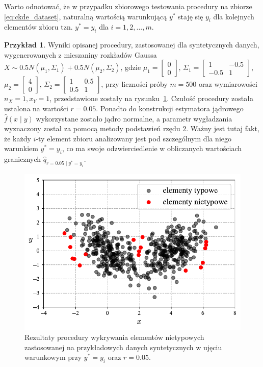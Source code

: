\documentclass[12pt,a4paper,oneside]{book}
\theoremstyle{definition}
\newtheorem{exmp}{Przykład}[chapter]
\begin{document}
Warto odnotować, że w przypadku zbiorowego testowania procedury na zbiorze \eqref{eq:ckde_dataset}, naturalną wartością warunkującą $y^*$ staję się $y_i$ dla kolejnych elementów zbioru tzn. $y^* = y_i$ dla $i=1,2,...,m$.

\begin{exmp} \label{exmp:outliers_detection_example2}
Wyniki opisanej procedury, zastosowanej dla syntetycznych danych, wygenerowanych z mieszaniny rozkładów Gaussa $X \sim 0.5 N(\mu_1,\Sigma_1) + 0.5 N(\mu_2,\Sigma_2)$, gdzie $\mu_1=\begin{bmatrix} 0 \\ 0 \end{bmatrix}$, $\Sigma_1=\begin{bmatrix} 1 & -0.5 \\ -0.5 & 1 \end{bmatrix}$, $\mu_2=\begin{bmatrix} 4 \\ 0 \end{bmatrix}$, $\Sigma_2=\begin{bmatrix} 1 & 0.5 \\ 0.5 & 1 \end{bmatrix}$, przy liczności próby $m=500$ oraz wymiarowości $n_X=1, x_Y=1$, przedstawione zostały na rysunku~\ref{fig:outliers_detection_example2}. Czułość procedury została ustalona na wartości $r=0.05$. Ponadto do konstrukcji estymatora jądrowego $\hat{f}(x \mid y)$ wykorzystane zostało jądro normalne, a parametr wygładzania wyznaczony został za pomocą metody podstawień rzędu $2$. Ważny jest tutaj fakt, że każdy $i$-ty element zbioru analizowany jest pod szczególnym dla niego warunkiem $y^* = y_i$, co ma swoje odzwierciedlenie w obliczanych wartościach granicznych $\hat{q}_{r=0.05 \mid y^*=y_i}$.
\begin{figure}[H]
    \centering
    \includegraphics[scale=0.65]{outliers_detection_example2}
    \vspace{-0.5cm} 
    \caption{Rezultaty procedury wykrywania elementów nietypowych zastosowanej na przykładowych danych syntetycznych w ujęciu warunkowym przy $y^*=y_i$ oraz $r=0.05$.}
    \label{fig:outliers_detection_example2}
\end{figure}
\end{exmp}
\end{document}
